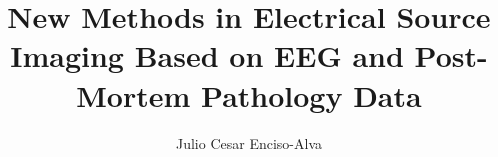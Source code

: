\documentclass[12pt]{report}\usepackage{utathesis,amsmath,amsthm,amssymb,listings,color,graphicx,float,enumitem,algorithm,algpseudocode,oldgerm,mathrsfs,microtype,geometry,latexsym,xpatch,etoolbox,tikz,bm}%
\begin{document}
    
       \author{Julio Cesar Enciso-Alva}
       \title{New Methods in Electrical Source Imaging Based on EEG and Post-Mortem Pathology Data}



          \titlepage



         \copyrightpage



\newpage

\begin{acknowledgements}



\end{acknowledgements}
\begin{abstract}
	
	\indent
\end{abstract}
\end{document}
